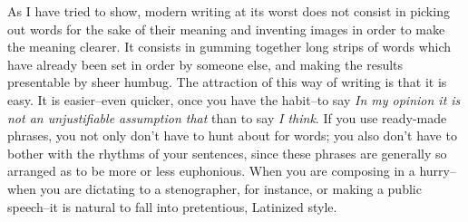 \documentclass[a4paper]{article}
\begin{document}
As I have tried to show, modern writing at its worst does not consist in picking out words for the sake of their meaning and inventing images in order to make the meaning clearer. It consists in gumming together long strips of words which have already been set in order by someone else, and making the results presentable by sheer humbug. The attraction of this way of writing is that it is easy. It is easier--even quicker, once you have the habit--to say \textit{In my opinion it is not an unjustifiable assumption that} than to say \textit{I think}. If you use ready-made phrases, you not only don't have to hunt about for words; you also don't have to bother with the rhythms of your sentences, since these phrases are generally so arranged as to be more or less euphonious. When you are composing in a hurry--when you are dictating to a stenographer, for instance, or making a public speech--it is natural to fall into pretentious, Latinized style. 
\end{document}
